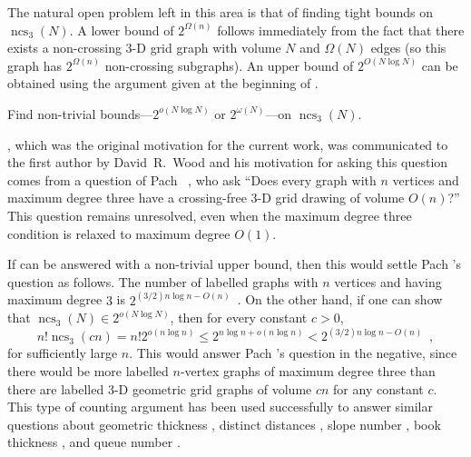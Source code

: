 \documentclass[12pt]{article}
\newcommand{\n}{N}
\DeclareMathOperator{\crs}{cr}
\DeclareMathOperator{\ncs}{ncs}
\begin{document}

The natural open problem left in this area is that of finding tight bounds
on $\ncs_3(\n)$.  A lower bound of $2^{\Omega(n)}$ follows immediately
from the fact that there exists a non-crossing 3-D grid graph with
volume $\n$ and $\Omega(N)$ edges (so this graph has $2^{\Omega(n)}$
non-crossing subgraphs).  An upper bound of $2^{O(\n\log\n)}$ can be
obtained using the argument given at the beginning of .

\begin{op}
  Find non-trivial bounds---$2^{o(\n\log\n)}$ or $2^{\omega(\n)}$---on
  $\ncs_3(\n)$.
\end{op}

, which was the original motivation for the current
work, was communicated to the first author by David~R.~Wood and
his motivation for asking this question comes from a question of Pach
\etal~\cite{pach.thiele.ea:three-dimensional}, who ask ``Does every graph
with $n$ vertices and maximum degree three have a crossing-free 3-D grid
drawing of volume $O(n)$?''  This question remains unresolved, even when
the maximum degree three condition is relaxed to maximum degree $O(1)$.

If  can be answered with a  non-trivial
upper bound, then this would settle Pach \etal's question
as follows.  The number of labelled graphs with $n$
vertices and having maximum degree $3$ is $2^{(3/2)n\log n -
O(n)}$~\cite[Appendix~A]{barat.matousek.ea:bounded-degree}. On the other
hand, if one can show that $\ncs_3(\n)\in 2^{o(\n\log\n)}$, then for
every constant $c>0$,
\[
   n!\ncs_3(cn) = n!2^{o(n\log n)} \le 2^{n\log n + o(n\log n)}
   < 2^{(3/2)n\log n - O(n)} \enspace ,
\]
for sufficiently large $n$. This would answer Pach \etal's question
in the negative, since there would be more labelled $n$-vertex graphs of
maximum degree three than there are labelled 3-D geometric grid
graphs of volume $cn$ for any constant $c$.   This type of counting
argument has been used successfully to answer similar questions
about geometric thickness \cite{barat.matousek.ea:bounded-degree},
distinct distances \cite{carmi.dujmovic.ea:distinct}, slope number
\cite{pach.palvolgyi:bounded}, book thickness \cite{malitz:graphs},
and queue number \cite{malitz:graphs,wood:bounded}.
\end{document}
